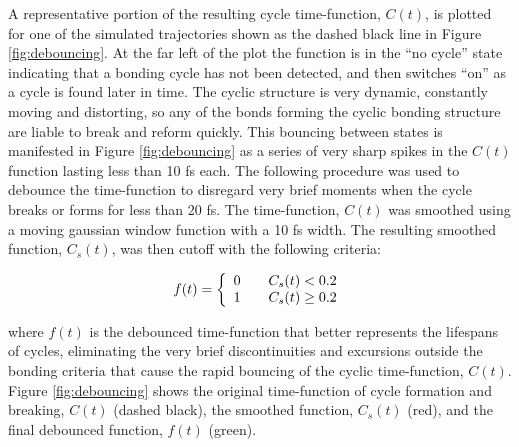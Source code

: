 A representative portion of the resulting cycle time-function, $C(t)$, is plotted for one of the simulated trajectories shown as the dashed black line in Figure \ref{fig:debouncing}. At the far left of the plot the function is in the ``no cycle'' state indicating that a bonding cycle has not been detected, and then switches ``on'' as a cycle is found later in time. The cyclic structure is very dynamic, constantly moving and distorting, so any of the bonds forming the cyclic bonding structure are liable to break and reform quickly. This bouncing between states is manifested in Figure \ref{fig:debouncing} as a series of very sharp spikes in the $C(t)$ function lasting less than 10 fs each. The following procedure was used to debounce the time-function to disregard very brief moments when the cycle breaks or forms for less than 20 fs. The time-function, $C(t)$ was smoothed using a moving gaussian window function with a 10 fs width. The resulting smoothed function, $C_s(t)$, was then cutoff with the following criteria:

\[
  f(t) = \left\{ 
  \begin{array}{l l}
    0 & \quad C_s(t) < 0.2\\
    1 & \quad C_s(t) \geq 0.2\\
  \end{array} \right.
\]

where $f(t)$ is the debounced time-function that better represents the lifespans of cycles, eliminating the very brief discontinuities and excursions outside the bonding criteria that cause the rapid bouncing of the cyclic time-function, $C(t)$. Figure \ref{fig:debouncing} shows the original time-function of cycle formation and breaking, $C(t)$ (dashed black), the smoothed function, $C_s(t)$ (red), and the final debounced function, $f(t)$ (green).

